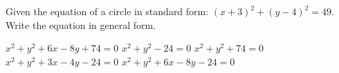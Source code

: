 \documentclass[11pt]{exam}
\begin{document}
\begin{questions}
\begin{minipage}{\linewidth}
\begin{choices}
	\CorrectChoice {}
	\choice {}
	\choice {}
	\choice {}
\end{choices} \answerline
\vspace{0.5in}

\end{minipage}
\begin{minipage}{\linewidth}
\question[3] Given the equation of a circle in standard form: $(x + 3)^2 + (y - 4)^2 = 49$. Write the equation in general form.
\vspace{1ex}
\begin{choices}
	\choice $x^2+y^2+6x-8y+74=0$
	\choice $x^2+y^2-24=0$
	\choice $x^2+y^2+74 = 0$
	\choice $x^2+y^2+3x-4y-24=0$
	\CorrectChoice $x^2+y^2+6x-8y-24=0$
\end{choices} \answerline
\vspace{0.5in}

\end{minipage}
\end{questions}
\end{document}

